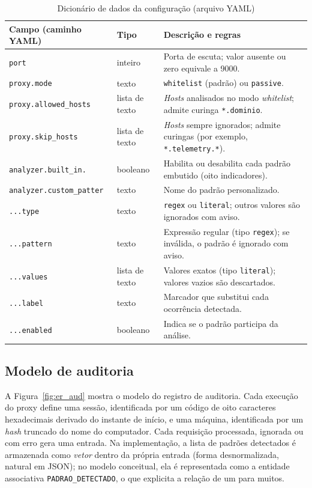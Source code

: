 \begin{table}[htb]
\centering
\caption{Dicionário de dados da configuração (arquivo YAML)}\label{tab:dd_cfg}
\small
\begin{tabular}{|p{4.1cm}|p{2.3cm}|p{7.5cm}|}
\hline
\textbf{Campo (caminho YAML)} & \textbf{Tipo} & \textbf{Descrição e regras} \\ \hline
\texttt{port} & inteiro & Porta de escuta; valor ausente ou zero equivale a 9000. \\ \hline
\texttt{proxy.mode} & texto & \texttt{whitelist} (padrão) ou \texttt{passive}. \\ \hline
\texttt{proxy.allowed\_hosts} & lista de texto & \textit{Hosts} analisados no modo \textit{whitelist}; admite curinga \texttt{*.dominio}. \\ \hline
\texttt{proxy.skip\_hosts} & lista de texto & \textit{Hosts} sempre ignorados; admite curingas (por exemplo, \texttt{*.telemetry.*}). \\ \hline
\texttt{analyzer.built\_in.} & booleano & Habilita ou desabilita cada padrão embutido (oito indicadores). \\ \hline
\texttt{analyzer.custom\_patter} & texto & Nome do padrão personalizado. \\ \hline
\texttt{...type} & texto & \texttt{regex} ou \texttt{literal}; outros valores são ignorados com aviso. \\ \hline
\texttt{...pattern} & texto & Expressão regular (tipo \texttt{regex}); se inválida, o padrão é ignorado com aviso. \\ \hline
\texttt{...values} & lista de texto & Valores exatos (tipo \texttt{literal}); valores vazios são descartados. \\ \hline
\texttt{...label} & texto & Marcador que substitui cada ocorrência detectada. \\ \hline
\texttt{...enabled} & booleano & Indica se o padrão participa da análise. \\ \hline
\end{tabular}
\end{table}

\subsection{Modelo de auditoria}

A Figura~\ref{fig:er_aud} mostra o modelo do registro de auditoria. Cada execução do proxy define uma sessão, identificada por um código de oito caracteres hexadecimais derivado do instante de início, e uma máquina, identificada por um \textit{hash} truncado do nome do computador. Cada requisição processada, ignorada ou com erro gera uma entrada. Na implementação, a lista de padrões detectados é armazenada como \textit{vetor} dentro da própria entrada (forma desnormalizada, natural em JSON); no modelo conceitual, ela é representada como a entidade associativa \texttt{PADRAO\_DETECTADO}, o que explicita a relação de um para muitos.

